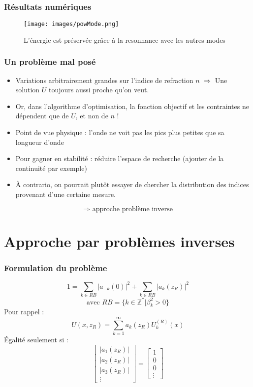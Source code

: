 \documentclass[handout]{beamer}
\begin{document}
\begin{frame}
	\frametitle{Résultats numériques}
\begin{figure}[!h]
	\centering
	\texttt{[image: images/powMode.png]}
	\caption{L'énergie est préservée grâce à la resonnance avec les autres modes}
	\label{fig:powMode}
\end{figure}
\end{frame}

\begin{frame}
	\frametitle{Un problème mal posé}
\begin{itemize}
	\item Variations arbitrairement grandes sur l'indice de refraction $n$ $\Rightarrow$ Une solution $U$ toujours aussi proche qu'on veut.
	\item Or, dans l'algorithme d'optimisation, la fonction objectif et les contraintes ne dépendent que de $U$, et non de $n$ !
	\item Point de vue physique : l'onde ne voit pas les pics plus petites que sa longueur d'onde
	\item Pour gagner en stabilité : réduire l'espace de recherche (ajouter de la continuité par exemple)
	\item À contrario, on pourrait plutôt essayer de chercher la distribution des indices provenant d'une certaine mesure.
\end{itemize}
\[\Rightarrow \text{ approche problème inverse}\]
\end{frame}

\section{Approche par problèmes inverses}
\begin{frame}
	\frametitle{Formulation du problème}
\[1=\sum_{k\in RB} |a_{-k}(0)|^2 + \sum_{k\in RB} |a_k(z_R)|^2 \]
\[\text{avec } RB=\{k\in \mathbb{Z}^* | \beta_k^2>0\}\]
Pour rappel :
	\[U(x,z_R)=\sum_{k=1}^\infty a_k(z_R)U_k^{(R)}(x)\]
Égalité seulement si :
\begin{equation}\label{eq23}
	\begin{bmatrix} |a_1(z_R)| \\ |a_2(z_R)| \\ |a_3(z_R)| \\ \vdots \end{bmatrix} = \begin{bmatrix} 1 \\ 0 \\ 0 \\ \vdots \end{bmatrix}
\end{equation}
\end{frame}
\end{document}
